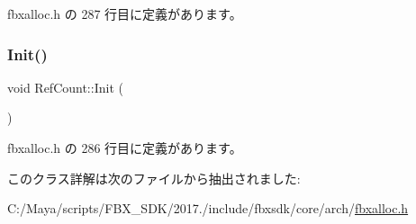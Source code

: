  fbxalloc.\+h の 287 行目に定義があります。

\mbox{\label{class_ref_count_af2574bc3b90cd73d040d6bc4b334e2d8}} 
\subsubsection{\texorpdfstring{Init()}{Init()}}
{\footnotesize\ttfamily void Ref\+Count\+::\+Init (\begin{DoxyParamCaption}{ }\end{DoxyParamCaption})\hspace{0.3cm}{\ttfamily [inline]}}



 fbxalloc.\+h の 286 行目に定義があります。



このクラス詳解は次のファイルから抽出されました\+:\begin{DoxyCompactItemize}
\item 
C\+:/\+Maya/scripts/\+F\+B\+X\+\_\+\+S\+D\+K/2017./include/fbxsdk/core/arch/\hyperlink{fbxalloc_8h}{fbxalloc.\+h}\end{DoxyCompactItemize}
